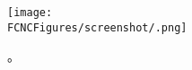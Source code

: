 \begin{figure}[htb]
\centering
\texttt{[image: \\FCNCFigures/screenshot/.png]}
\caption{。}
\label{fig:}
\end{figure}